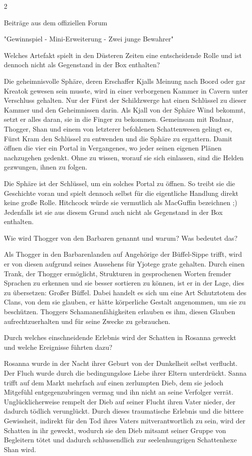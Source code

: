 \documentclass[10pt, a4paper, oneside]{book}
\begin{document}
\begin{multicols}{2}
\begin{center}
    Beiträge aus dem offiziellen Forum

    "Gewinnspiel - Mini-Erweiterung - Zwei junge Bewahrer"
\end{center}

Welches Artefakt spielt in den Düsteren Zeiten eine entscheidende Rolle und ist dennoch nicht als Gegenstand in der Box enthalten?\bigskip

Die geheimnisvolle Sphäre, deren Erschaffer Kjalls Meinung nach Boord oder gar Kreatok gewesen sein musste, wird in einer verborgenen Kammer in Cavern unter Verschluss gehalten. Nur der Fürst der Schildzwerge hat einen Schlüssel zu dieser Kammer und den Geheimnissen darin. Als Kjall von der Sphäre Wind bekommt, setzt er alles daran, sie in die Finger zu bekommen. Gemeinsam mit Rudnar, Thogger, Shan und einem von letzterer befohlenen Schattenwesen gelingt es, Fürst Kram den Schlüssel zu entwenden und die Sphäre zu ergattern. Damit öffnen die vier ein Portal in Vergangenes, wo jeder seinen eigenen Plänen nachzugehen gedenkt. Ohne zu wissen, worauf sie sich einlassen, sind die Helden gezwungen, ihnen zu folgen.

Die Sphäre ist der Schlüssel, um ein solches Portal zu öffnen. So treibt sie die Geschichte voran und spielt dennoch selbst für die eigentliche Handlung direkt keine große Rolle. Hitchcock würde sie vermutlich als MacGuffin bezeichnen ;) Jedenfalls ist sie aus diesem Grund auch nicht als Gegenstand in der Box enthalten.\bigskip

Wie wird Thogger von den Barbaren genannt und warum? Was bedeutet das?\bigskip

Als Thogger in den Barbarenlanden auf Angehörige der Büffel-Sippe trifft, wird er von diesen aufgrund seines Aussehens für Yjotege grate gehalten. Durch einen Trank, der Thogger ermöglicht, Strukturen in gesprochenen Worten fremder Sprachen zu erkennen und sie besser sortieren zu können, ist er in der Lage, dies zu übersetzen: Großer Büffel. Dabei handelt es sich um eine Art Schutztotem des Clans, von dem sie glauben, er hätte körperliche Gestalt angenommen, um sie zu beschützen. Thoggers Schamanenfähigkeiten erlauben es ihm, diesen Glauben aufrechtzuerhalten und für seine Zwecke zu gebrauchen.\bigskip

Durch welches einschneidende Erlebnis wird der Schatten in Rosanna geweckt und welche Ereignisse führten dazu?\bigskip

Rosanna wurde in der Nacht ihrer Geburt von der Dunkelheit selbst verflucht. Der Fluch wurde durch die bedingungslose Liebe ihrer Eltern unterdrückt. Sanna trifft auf dem Markt mehrfach auf einen zerlumpten Dieb, dem sie jedoch Mitgefühl entgegenzubringen vermag und ihn nicht an seine Verfolger verrät. Unglücklicherweise rempelt der Dieb auf seiner Flucht ihren Vater nieder, der dadurch tödlich verunglückt. Durch dieses traumatische Erlebnis und die bittere Gewissheit, indirekt für den Tod ihres Vaters mitverantwortlich zu sein, wird der Schatten in ihr geweckt, wodurch sie den Dieb mitsamt seiner Gruppe von Begleitern tötet und dadurch schlussendlich zur seelenhungrigen Schattenhexe Shan wird.\bigskip


\end{multicols}
\end{document}

